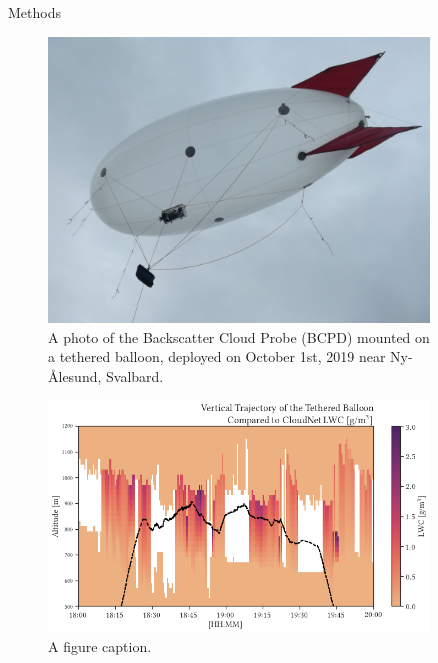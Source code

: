 \documentclass[final]{beamer}
\newlength{\sepwidth}
\newlength{\colwidth}
\newcommand{\separatorcolumn}{\begin{column}{\sepwidth}\end{column}}
\begin{document}
\begin{frame}[t]
\begin{columns}[t]
\begin{column}{\colwidth}
\begin{block}{Methods}
        \begin{figure}
          \centering
          \includegraphics[width=0.8\colwidth]{figure/balloon.png}
          \caption{A photo of the Backscatter Cloud Probe (BCPD) mounted on a tethered balloon, deployed on October 1st, 2019 near Ny-\r{A}lesund, Svalbard.}
        \end{figure}
      \end{block}

      \begin{figure}
        \centering
        \includegraphics[width=\colwidth]{figure/ts_alt.png}
        \caption{A figure caption.}
      \end{figure}

    \end{column}

    \separatorcolumn
    \begin{column}{\colwidth}


\end{column}
\end{columns}
\end{frame}
\end{document}
